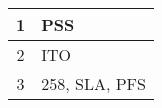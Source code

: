 \documentclass[crop]{standalone}
\begin{document}
    \begin{tabularx}{94pt}{|c|X|}
    \hline
        1 & PSS \\
    \hline
        2 & ITO \\
    \hline
        3 & 258, SLA, PFS \\
    \hline
    \end{tabularx}
\end{document}
